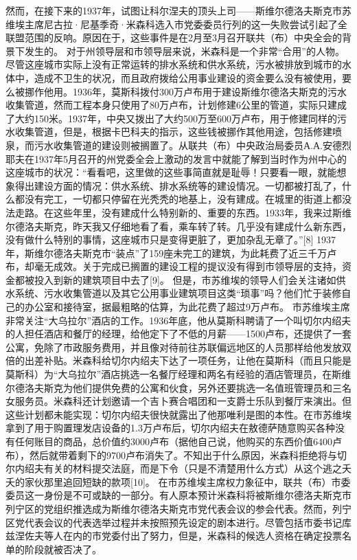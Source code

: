 然而，在接下来的1937年，试图让科尔涅夫的顶头上司——斯维尔德洛夫斯克市苏维埃主席尼古拉·尼基季奇·米森科选入市党委委员行列的这一失败尝试引起了全联盟范围的反响。原因在于，这些事件是在2月至3月召开联共（布）中央全会的背景下发生的。
对于州领导层和市领导层来说，米森科是一个非常“合用”的人物。尽管这座城市实际上没有正常运转的排水系统和供水系统，污水被排放到城市的水体中，造成不卫生的状况，而且政府拨给公用事业建设的资金要么没有被使用，要么被挪作他用。1936年，莫斯科拨付300万卢布用于建设斯维尔德洛夫斯克的污水收集管道，然而工程本身只使用了80万卢布，计划修建6公里的管道，实际只建成了大约150米。1937年，中央又拨出了大约500万至600万卢布，用于修建同样的污水收集管道，但是，根据卡巴科夫的指示，这些钱被挪作其他用途，包括修建喷泉，而污水收集管道的建设则被搁置了。从联共（布）中央政治局委员А.А.安德烈耶夫在1937年5月召开的州党委全会上激动的发言中就能了解到当时作为州中心的这座城市的状况：“看看吧，这里做的这些事简直就是耻辱！只要看一眼，就能想象得出建设方面的情况：供水系统、排水系统等的建设情况。一切都被打乱了，什么都没有完工，一切都只停留在光秃秃的地基上，没有建成。在城里的街道上都没法走路。在这些年里，没有建成什么特别新的、重要的东西。1933年，我来过斯维尔德洛夫斯克，昨天我又仔细地看了看，乘车转了转。几乎没有建成什么新东西，没有做什么特别的事情，这座城市只是变得更脏了，更加杂乱无章了。”[8]
1937年，斯维尔德洛夫斯克市“装点”了159座未完工的建筑，为此耗费了近三千万卢布，却毫无成效。关于完成已搁置的建设工程的提议没有得到市领导层的支持，资金都被投入到新的建筑项目中去了[9]。
但是，市苏维埃的领导人们会关注诸如供水系统、污水收集管道以及其它公用事业建筑项目这类“琐事”吗？他们忙于装修自己的办公室和接待室，据最粗略的估算，为此花费了超过9万卢布。
市苏维埃主席非常关注“大乌拉尔”酒店的工作。1936年底，他从莫斯科聘请了一个叫切尔内绍夫的人担任酒店和餐厅的经理，给他定下了不低的月薪——1500卢布，还提供了一套公寓，免除了市政服务费用，并且像对待前往苏联偏远地区的人员那样给他发放双倍的出差补贴。米森科给切尔内绍夫下达了一项任务，让他在莫斯科（而且只能是莫斯科）为“大乌拉尔”酒店挑选一名餐厅经理和两名有经验的酒店管理员，在斯维尔德洛夫斯克为他们提供免费的公寓和伙食，另外还要挑选一名值班管理员和三名女服务员。米森科还计划邀请一个吉卜赛合唱团和一支爵士乐队到餐厅来演出。但这些计划都未能实现：切尔内绍夫很快就露出了他那唯利是图的本性。在市苏维埃拿到了用于购置理发店设备的1.3万卢布后，切尔内绍夫在敖德萨随意购买各种没有任何账目的商品，总价值约3000卢布（据他自己说，他购买的东西价值6400卢布），然后就带着剩下的9700卢布消失了。不知出于什么原因，米森科拒绝将与切尔内绍夫有关的材料提交法庭，而是下令（只是不清楚用什么方式）从这个逃之夭夭的家伙那里追回短缺的款项[10]。
在市苏维埃主席权力象征中，联共（布）市委委员这一身份是不可或缺的一部分。有人原本预计米森科将被斯维尔德洛夫斯克市列宁区的党组织推选成为斯维尔德洛夫斯克市党代表会议的参会代表。然而，列宁区党代表会议的代表选举过程并未按照预先设定的剧本进行。尽管包括市委书记库兹涅佐夫等人在内的市党委付出了努力，但是，米森科的候选人资格在确定投票名单的阶段就被否决了。
